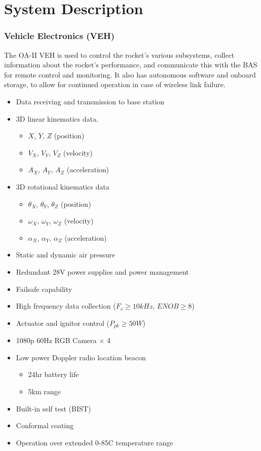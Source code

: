 \documentclass[12pt,article]{memoir}
\begin{document}
\newpage

\chapter{System Description}
\subsection{Vehicle Electronics (VEH)}
The OA-II VEH is used to control the rocket's various subsystems, collect information about the rocket's performance, and communicate this with the BAS for remote control and monitoring. It also has autonomous software and onboard storage, to allow for continued operation in case of wireless link failure.
\begin{itemize}
	\item Data receiving and transmission to base station
	\item 3D linear kinematics data.
	\begin{itemize}
		\item $X$, $Y$, $Z$ (position)
		\item $V_X$, $V_Y$, $V_Z$ (velocity)
		\item $A_X$, $A_Y$, $A_Z$ (acceleration)
	\end{itemize}
	\item 3D rotational kinematics data
	\begin{itemize}
		\item $\theta_X$, $\theta_Y$, $\theta_Z$ (position)
		\item $\omega_X$, $\omega_Y$, $\omega_Z$ (velocity)
		\item $\alpha_X$, $\alpha_Y$, $\alpha_Z$ (acceleration)
	\end{itemize}
	\item Static and dynamic air pressure
	\item Redundant 28V power supplies and power management
	\item Failsafe capability
	\item High frequency data collection ($F_s \geq 10kHz$, $ENOB \geq 8$)
	\item Actuator and ignitor control ($P_{pk} \geq 50W$)
	\item 1080p 60Hz RGB Camera $\times$ 4
	\item Low power Doppler radio location beacon
	\begin{itemize}
		\item 24hr battery life
		\item 5km range
	\end{itemize}
	\item Built-in self test (BIST)
	\item Conformal coating
	\item Operation over extended 0-85\degree C temperature range
\end{itemize}
\end{document}
